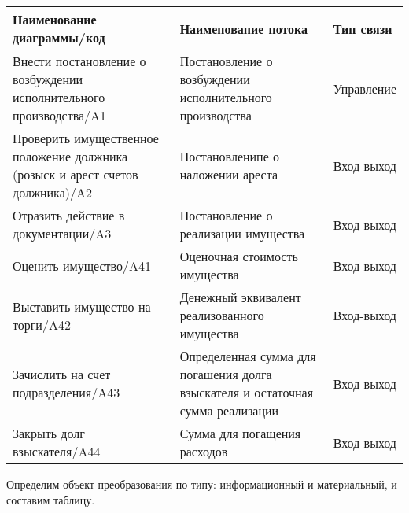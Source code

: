 {\small
\begin{longtable}{
		|p{}
		|p{}
		|p{}
		| } 
	\hline
	\textbf{Наименование диаграммы/код}
		& \textbf{Наименование потока}
		& \textbf{Тип связи} \\ \hline
	\endhead
	Внести постановление о возбуждении исполнительного производства/A1
		& Постановление о возбуждении исполнительного производства
		& Управление \\ \hline
	Проверить имущественное положение должника
		(розыск и арест счетов должника)/A2
		& Постановленипе о наложении ареста
		& Вход-выход \\ \hline
	Отразить действие в документации/A3
		& Постановление о реализации имущества
		& Вход-выход \\ \hline
	Оценить имущество/A41
		& Оценочная стоимость имущества
		& Вход-выход \\ \hline
	Выставить имущество на торги/A42
		& Денежный эквивалент реализованного имущества
		& Вход-выход \\ \hline
	Зачислить на счет подразделения/A43
		& Определенная сумма для погашения долга взыскателя
			и остаточная сумма реализации
		& Вход-выход \\ \hline
	Закрыть долг взыскателя/A44
		& Сумма для погащения расходов
		& Вход-выход \\ \hline
\end{longtable}
}

Определим объект преобразования по типу: информационный и материальный,
и составим таблицу.

